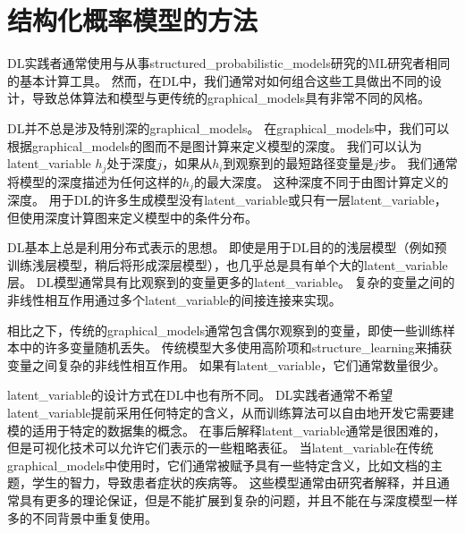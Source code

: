 \section{结构化概率模型的方法}
\label{sec:the_deep_learning_approach_to_structured_probabilistic_models}

\gls{DL}实践者通常使用与从事\gls{structured_probabilistic_models}研究的\gls{ML}研究者相同的基本计算工具。
然而，在\gls{DL}中，我们通常对如何组合这些工具做出不同的设计，导致总体算法和模型与更传统的\gls{graphical_models}具有非常不同的风格。


\gls{DL}并不总是涉及特别深的\gls{graphical_models}。
在\gls{graphical_models}中，我们可以根据\gls{graphical_models}的图而不是图计算来定义模型的深度。
我们可以认为\gls{latent_variable} $h_j$处于深度$j$，如果从$h_i$到观察到的最短路径变量是$j$步。
我们通常将模型的深度描述为任何这样的$h_j$的最大深度。 
这种深度不同于由图计算定义的深度。
用于\gls{DL}的许多生成模型没有\gls{latent_variable}或只有一层\gls{latent_variable}，但使用深度计算图来定义模型中的条件分布。


\gls{DL}基本上总是利用分布式表示的思想。
即使是用于\gls{DL}目的的浅层模型（例如预训练浅层模型，稍后将形成深层模型），也几乎总是具有单个大的\gls{latent_variable}层。
\gls{DL}模型通常具有比观察到的变量更多的\gls{latent_variable}。
复杂的变量之间的非线性相互作用通过多个\gls{latent_variable}的间接连接来实现。


相比之下，传统的\gls{graphical_models}通常包含偶尔观察到的变量，即使一些训练样本中的许多变量随机丢失。
传统模型大多使用高阶项和\gls{structure_learning}来捕获变量之间复杂的非线性相互作用。
如果有\gls{latent_variable}，它们通常数量很少。



\gls{latent_variable}的设计方式在\gls{DL}中也有所不同。
\gls{DL}实践者通常不希望\gls{latent_variable}提前采用任何特定的含义，从而训练算法可以自由地开发它需要建模的适用于特定的数据集的概念。
在事后解释\gls{latent_variable}通常是很困难的，但是可视化技术可以允许它们表示的一些粗略表征。
当\gls{latent_variable}在传统\gls{graphical_models}中使用时，它们通常被赋予具有一些特定含义，比如文档的主题，学生的智力，导致患者症状的疾病等。
这些模型通常由研究者解释，并且通常具有更多的理论保证，但是不能扩展到复杂的问题，并且不能在与深度模型一样多的不同背景中重复使用。


